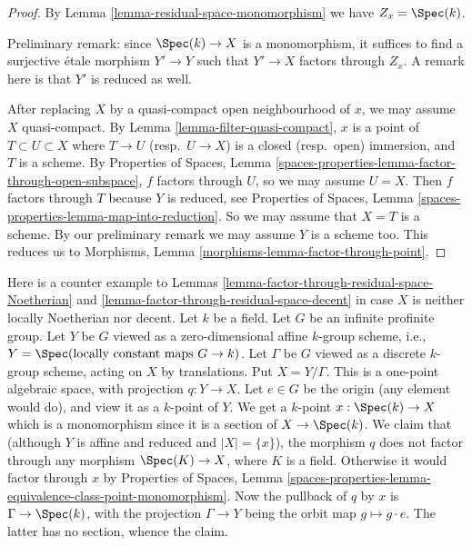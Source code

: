 \begin{proof}
By Lemma \ref{lemma-residual-space-monomorphism} we have $Z_x = \Spec(k)$.

\medskip\noindent
Preliminary remark: since $\Spec(k) \to X$ is a monomorphism,
it suffices to find
a surjective \'etale morphism $Y' \to Y$ such that $Y' \to X$
factors through $Z_x$. A remark here is that $Y'$ is reduced as well.

\medskip\noindent
After replacing $X$ by a quasi-compact open neighbourhood of $x$, 
we may assume $X$ quasi-compact. By Lemma \ref{lemma-filter-quasi-compact}, $x$
is a point of $T \subset U \subset X$ where $T \to U$ (resp.\ $U \to X$)
is a closed (resp.\ open) immersion, and $T$ is a scheme.
By Properties of Spaces, Lemma
\ref{spaces-properties-lemma-factor-through-open-subspace},
$f$ factors through $U$, so we may assume $U = X$. Then $f$
factors through $T$ because $Y$ is reduced, see
Properties of Spaces, Lemma \ref{spaces-properties-lemma-map-into-reduction}.
So we may assume that $X = T$ is a scheme.
By our preliminary remark we may assume $Y$ is a scheme too.
This reduces us to Morphisms, Lemma \ref{morphisms-lemma-factor-through-point}.
\end{proof}

\begin{example}
\label{example-does-not-factor-through-residual-gerbe}
Here is a counter example to
Lemmas \ref{lemma-factor-through-residual-space-Noetherian} and
\ref{lemma-factor-through-residual-space-decent}
in case $X$ is neither locally Noetherian nor decent.
Let $k$ be a field. Let $G$ be an infinite profinite group.
Let $Y$ be $G$ viewed as a zero-dimensional affine $k$-group scheme, i.e.,
$Y = \Spec(\text{locally constant maps } G \to k)$.
Let $\Gamma$ be $G$ viewed as a discrete $k$-group scheme,
acting on $X$ by translations. Put $X = Y/\Gamma$.
This is a one-point algebraic space, with projection $q : Y \to X$.
Let $e \in G$ be the origin (any element would do), and view
it as a $k$-point of $Y$. We get a $k$-point $x :\Spec(k) \to X$
which is a monomorphism since it is a section of $X \to \Spec(k)$.
We claim that (although $Y$ is affine and reduced and $|X| = \{x\}$),
the morphism $q$ does not factor through any morphism $\Spec(K) \to X$,
where $K$ is a field. Otherwise it would factor through
$x$ by Properties of Spaces, Lemma
\ref{spaces-properties-lemma-equivalence-class-point-monomorphism}.
Now the pullback of $q$ by $x$ is $\Gamma \to \Spec(k)$, with
the projection $\Gamma \to Y$ being the orbit map $g \mapsto g \cdot e$.
The latter has no section, whence the claim.
\end{example}

